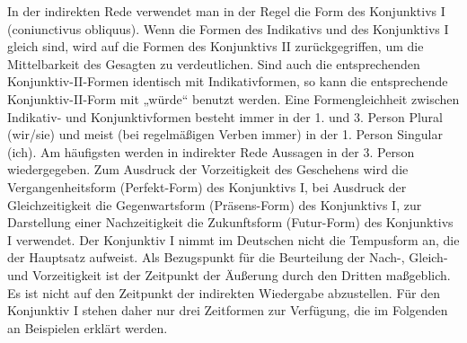 In der indirekten Rede verwendet man in der Regel die Form des Konjunktivs I (coniunctivus obliquus). Wenn die Formen des Indikativs und des Konjunktivs I gleich sind, wird auf die Formen des Konjunktivs II zurückgegriffen, um die Mittelbarkeit des Gesagten zu verdeutlichen. Sind auch die entsprechenden Konjunktiv-II-Formen identisch mit Indikativformen, so kann die entsprechende Konjunktiv-II-Form mit „würde“ benutzt werden. Eine Formengleichheit zwischen Indikativ- und Konjunktivformen besteht immer in der 1. und 3. Person Plural (wir/sie) und meist (bei regelmäßigen Verben immer) in der 1. Person Singular (ich). Am häufigsten werden in indirekter Rede Aussagen in der 3. Person wiedergegeben.
Zum Ausdruck der Vorzeitigkeit des Geschehens wird die Vergangenheitsform (Perfekt-Form) des Konjunktivs I, bei Ausdruck der Gleichzeitigkeit die Gegenwartsform (Präsens-Form) des Konjunktivs I, zur Darstellung einer Nachzeitigkeit die Zukunftsform (Futur-Form) des Konjunktivs I verwendet. Der Konjunktiv I nimmt im Deutschen nicht die Tempusform an, die der Hauptsatz aufweist. Als Bezugspunkt für die Beurteilung der Nach-, Gleich- und Vorzeitigkeit ist der Zeitpunkt der Äußerung durch den Dritten maßgeblich. Es ist nicht auf den Zeitpunkt der indirekten Wiedergabe abzustellen.
Für den Konjunktiv I stehen daher nur drei Zeitformen zur Verfügung, die im Folgenden an Beispielen erklärt werden.